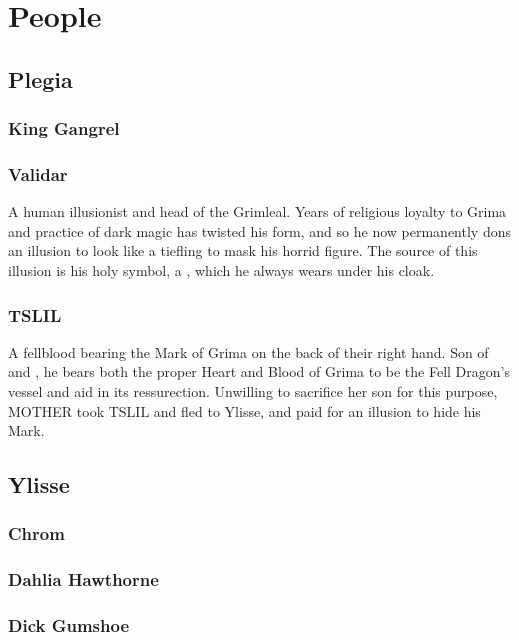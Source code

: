 
\section{People}
\subsection{Plegia}
\subsubsection{King Gangrel}
\label{people:gangrel}

\subsubsection{Validar}
\label{people:validar}
A human illusionist and head of the Grimleal. Years of religious loyalty to Grima and practice of dark magic has twisted his form, and so he now permanently dons an illusion to look like a tiefling to mask his horrid figure. The source of this illusion is his holy symbol, a , which he always wears under his cloak.


\subsubsection{TSLIL}
\label{people:tslil}
A fellblood bearing the Mark of Grima on the back of their right hand. Son of  and , he bears both the proper Heart and Blood of Grima to be the Fell Dragon's vessel and aid in its ressurection. Unwilling to sacrifice her son for this purpose, MOTHER took TSLIL and fled to Ylisse, and paid for an illusion to hide his Mark. 

\subsection{Ylisse}
\subsubsection{Chrom}
\label{people:chrom}


\subsubsection{Dahlia Hawthorne}
\label{people:dahlia}

\subsubsection{Dick Gumshoe}
\label{people:gumshoe}

